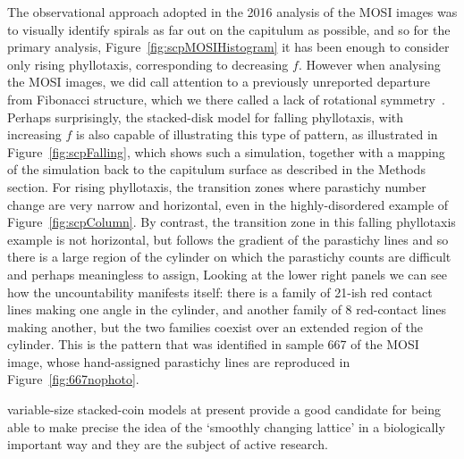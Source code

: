 The observational approach adopted in the 2016 analysis of the MOSI images was to visually identify spirals as far out on the capitulum as possible, and so for the primary analysis, Figure~\ref{fig:scpMOSIHistogram} it has been enough to consider only rising phyllotaxis, corresponding to decreasing $f$. 
However when analysing the MOSI images, we did call attention to a previously unreported departure from Fibonacci structure, which we there called a lack of rotational symmetry~\cite{swintonNovelFibonacciNonFibonacci2016}. Perhaps surprisingly, the stacked-disk model for falling phyllotaxis, with increasing $f$ is also capable of illustrating this type of pattern, as illustrated in Figure~\ref{fig:scpFalling}, which 
shows such a simulation, together with a mapping of the simulation back to the capitulum surface as described in the Methods section. 
For rising phyllotaxis, the transition zones where parastichy number change are very narrow and horizontal, even in the highly-disordered example of Figure~\ref{fig:scpColumn}. By contrast, the transition zone in this falling phyllotaxis example is not horizontal, but follows the gradient of the parastichy lines and so  there is a large region of the cylinder on which the parastichy counts are difficult and perhaps meaningless to assign, Looking at the lower right panels we can see how the uncountability manifests itself: there is a family of 21-ish red contact lines making one angle in the cylinder, and another family of 8 red-contact lines making another, but the two families coexist over an extended region of the cylinder. This is the pattern that was identified in sample 667 of the MOSI image, whose hand-assigned parastichy lines are reproduced in Figure~\ref{fig:667nophoto}.
 



variable-size  stacked-coin models at present provide a good candidate for being able to make precise the idea of the `smoothly changing lattice' in a biologically important way and they are the subject of active research.